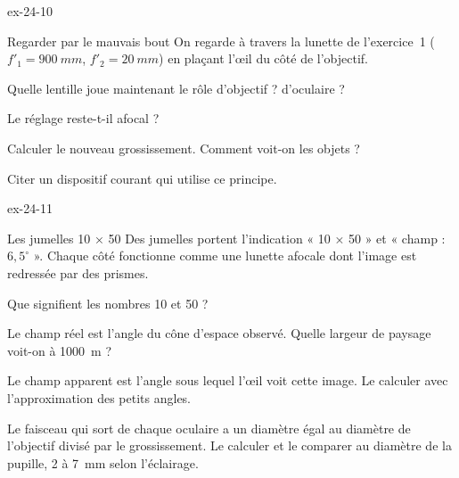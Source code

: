 \begin{blocLivre}{ex-24-10}
\begin{exercice}[2]{Regarder par le mauvais bout}
On regarde à travers la lunette de l'exercice~1 ($f'_1=\qty{900}{mm}$, $f'_2=\qty{20}{mm}$) en plaçant l'œil du côté de l'objectif.
\begin{questions}
\item Quelle lentille joue maintenant le rôle d'objectif ? d'oculaire ?
\item Le réglage reste-t-il afocal ?
\item Calculer le nouveau grossissement. Comment voit-on les objets ?
\item Citer un dispositif courant qui utilise ce principe.
\end{questions}
\end{exercice}
\end{blocLivre}
\begin{blocLivre}{ex-24-11}
\begin{exercice}[2]{Les jumelles 10 × 50}
Des jumelles portent l'indication « 10 × 50 » et « champ : $6{,}5^\circ$ ». Chaque côté fonctionne comme une lunette
afocale dont l'image est redressée par des prismes.
\begin{questions}
\item Que signifient les nombres 10 et 50 ?
\item Le champ réel est l'angle du cône d'espace observé. Quelle largeur de paysage voit-on à \qty{1000}{m} ?
\item Le champ apparent est l'angle sous lequel l'œil voit cette image. Le calculer avec l'approximation des petits angles.
\item Le faisceau qui sort de chaque oculaire a un diamètre égal au diamètre de l'objectif divisé par le grossissement.
Le calculer et le comparer au diamètre de la pupille, 2 à \qty{7}{mm} selon l'éclairage.
\end{questions}
\end{exercice}
\end{blocLivre}
